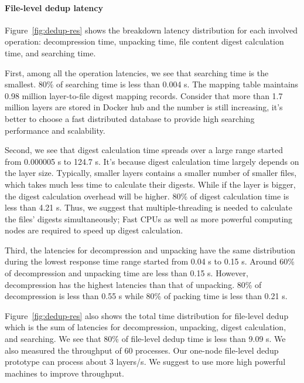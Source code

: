 \paragraph{File-level dedup latency}

%
Figure~\ref{fig:dedup-res} shows the breakdown latency distribution for each involved operation: decompression time, unpacking time, file content digest calculation time, and searching time.

First, among all the operation latencies, we see that searching time is the smallest. 80\% of searching time is less than 0.004 s. The mapping table maintains 0.98 million layer-to-file digest mapping records. Consider that more than 1.7 million layers are stored in Docker hub and the number is still increasing, it's better to choose a fast distributed database to provide high searching performance and scalability.
%
  
Second, we see that digest calculation time spreads over a large range started from 0.000005 s to 124.7 s. It's because digest calculation time
largely depends on the layer size. Typically, smaller layers contains a smaller number of smaller files, which takes much less time to
calculate their digests. While if the layer is bigger, the digest calculation overhead will be higher. 80\% of digest calculation time is
less than 4.21 s. 
Thus, we suggest that multiple-threading is needed to calculate the files' digests simultaneously; Fast CPUs as well as more powerful computing nodes
are required to speed up digest calculation.

Third, the latencies for decompression and unpacking have the same distribution during the lowest response time range started
from 0.04 s to 0.15 s. Around 60\% of decompression and unpacking time are less than 0.15 s. However, decompression has the highest
latencies than that of unpacking. 80\% of decompression is less than 0.55 s while 80\% of packing time is less than 0.21 s. 

Figure~\ref{fig:dedup-res} also shows the total time distribution for file-level dedup which is the sum of latencies for decompression,
unpacking, digest calculation, and searching. We see that 80\% of file-level dedup time is less than 9.09 s.
%
%
We also measured the 
throughput of 60 processes. Our one-node file-level dedup prototype can process about 3 layers/s. We suggest to use more high 
powerful machines to improve throughput.

